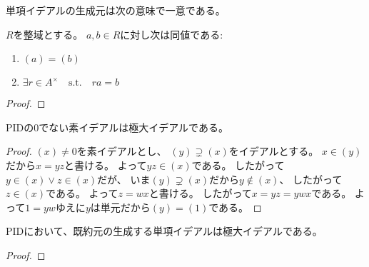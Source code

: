\documentclass[report]{jlreq}
\begin{document}
単項イデアルの生成元は次の意味で一意である。

\begin{theorem}[単項イデアルの生成元の一意性]
    $R$を整域とする。
    $a, b \in R$に対し次は同値である:
    \begin{enumerate}
        \item $(a) = (b)$
        \item $\exists r \in A^\times \quad \text{s.t.} \quad ra = b$
    \end{enumerate}
\end{theorem}

\begin{proof}
    \TODO{}
\end{proof}

\begin{theorem}
    PIDの$0$でない素イデアルは極大イデアルである。
\end{theorem}

\begin{proof}
    $(x) \neq 0$を素イデアルとし、
    $(y) \supsetneq (x)$をイデアルとする。
    $x \in (y)$だから$x = yz$と書ける。
    よって$yz \in (x)$である。
    したがって$y \in (x) \lor z \in (x)$だが、
    いま$(y) \supsetneq (x)$だから$y \notin (x)$、
    したがって$z \in (x)$である。
    よって$z = wx$と書ける。
    したがって$x = yz = ywx$である。
    よって$1 = yw$ゆえに$y$は単元だから$(y) = (1)$である。
\end{proof}

\begin{proposition}
    PIDにおいて、既約元の生成する単項イデアルは極大イデアルである。
\end{proposition}

\begin{proof}
    \TODO{}
\end{proof}

\end{document}
